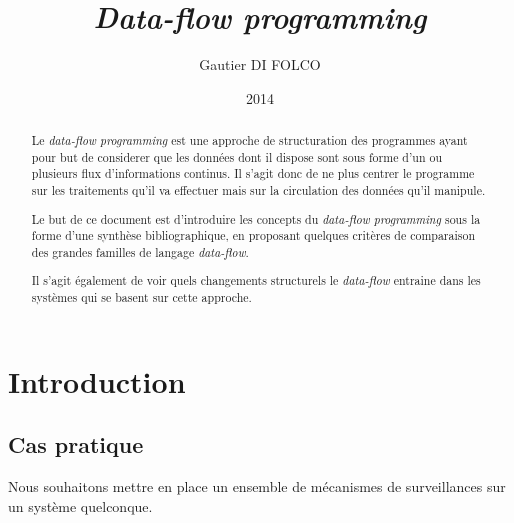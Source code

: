 \documentclass{article}
\title{\emph{Data-flow programming}}
\author{Gautier DI FOLCO}
\date{2014}
\begin{document}
\maketitle
\tableofcontents

\begin{abstract}
Le \emph{data-flow programming} est une approche de structuration des programmes
ayant pour but de considerer que les données dont il dispose sont sous forme
d'un ou plusieurs flux d'informations continus.
Il s'agit donc de ne plus centrer le programme sur les traitements qu'il va
effectuer mais sur la circulation des données qu'il manipule.

Le but de ce document est d'introduire les concepts du \emph{data-flow programming}
sous la forme d'une synthèse bibliographique, en proposant quelques critères de
comparaison des grandes familles de langage \emph{data-flow}.

Il s'agit également de voir quels changements structurels le \emph{data-flow}
entraine dans les systèmes qui se basent sur cette approche.
\end{abstract}





\section{Introduction}\label{introduction}

\subsection{Cas pratique}
Nous souhaitons mettre en place un ensemble de mécanismes de surveillances sur un
système quelconque.
\end{document}
